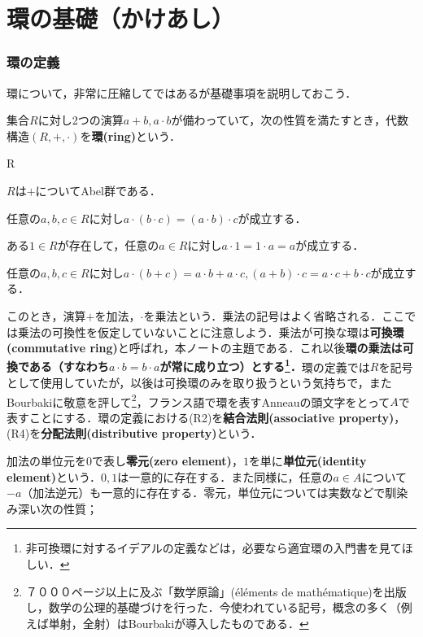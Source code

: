 \setcounter{part}{-1}
\part[Definition of Ring and more...]{環の基礎（かけあし）}
\section{環の定義}

環について，非常に圧縮してではあるが基礎事項を説明しておこう．

\begin{defi}[環]
	集合$R$に対し2つの演算$a+b,a\cdot b$が備わっていて，次の性質を満たすとき，代数構造$(R,+,\cdot)$を\textbf{環(ring)}という．
	\begin{defiterm}{R}
		\item $R$は$+$についてAbel群である．
		\item 任意の$a,b,c\in R$に対し$a\cdot (b\cdot c)=(a\cdot b)\cdot c$が成立する．
		\item ある$1\in R$が存在して，任意の$a\in R$に対し$a\cdot 1=1\cdot a=a$が成立する．
		\item 任意の$a,b,c\in R$に対し$a\cdot (b+c)=a\cdot b+a\cdot c, (a+b)\cdot c=a\cdot c+b\cdot c$が成立する．
	\end{defiterm}
\end{defi}

このとき，演算$+$を加法，$\cdot$を乗法という．乗法の記号はよく省略される．ここでは乗法の可換性を仮定していないことに注意しよう．乗法が可換な環は\textbf{可換環(commutative ring)}と呼ばれ，本ノートの主題である．これ以後\textbf{環の乗法は可換である（すなわち$a\cdot b=b\cdot a$が常に成り立つ）とする\footnote{非可換環に対するイデアルの定義などは，必要なら適宜環の入門書を見てほしい．}．}環の定義では$R$を記号として使用していたが，以後は可換環のみを取り扱うという気持ちで，またBourbakiに敬意を評して\footnote{７０００ページ以上に及ぶ「数学原論」(\'el\'ements de math\'ematique)を出版し，数学の公理的基礎づけを行った．今使われている記号，概念の多く（例えば単射，全射）はBourbakiが導入したものである．}，フランス語で環を表すAnneauの頭文字をとって$A$で表すことにする．環の定義における(R2)を\textbf{結合法則(associative property)}，(R4)を\textbf{分配法則(distributive property)}という．

加法の単位元を$0$で表し\textbf{零元(zero element)}，$1$を単に\textbf{単位元(identity element)}という．$0,1$は一意的に存在する．また同様に，任意の$a\in A$について$-a$（加法逆元）も一意的に存在する．零元，単位元については実数などで馴染み深い次の性質；

